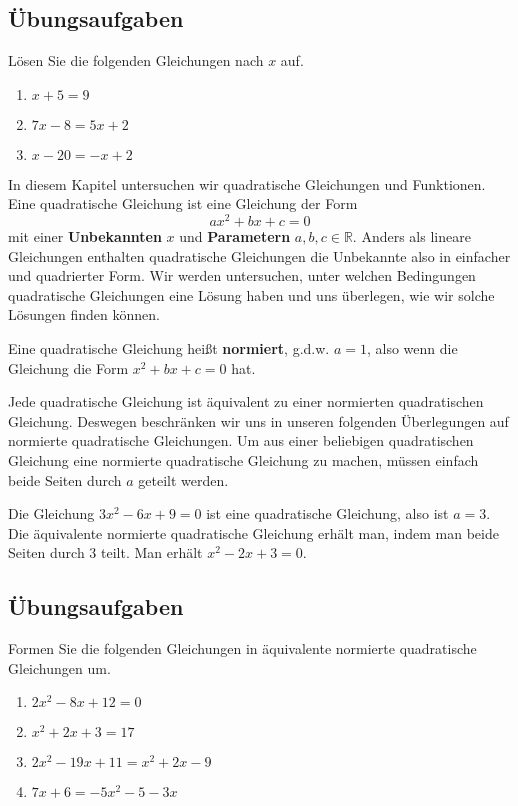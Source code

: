 \documentclass[../../main.tex]{subfiles}
\begin{document}
\subsection*{Übungsaufgaben}
Lösen Sie die folgenden Gleichungen nach $x$ auf.
\begin{enumerate}
    \item $x+5=9$
    \item $7x-8=5x+2$
    \item $x-20=-x+2$
\end{enumerate}
In diesem Kapitel untersuchen wir quadratische Gleichungen und Funktionen. Eine quadratische Gleichung ist eine Gleichung der Form
\[ax^2+bx+c=0\]
mit einer \textbf{Unbekannten} $x$ und \textbf{Parametern} $a,b,c\in\mathbb{R}$. Anders als lineare Gleichungen enthalten quadratische Gleichungen die Unbekannte also in einfacher und quadrierter Form. Wir werden untersuchen, unter welchen Bedingungen quadratische Gleichungen eine Lösung haben und uns überlegen, wie wir solche Lösungen finden können.
\begin{definition}
Eine quadratische Gleichung heißt \textbf{normiert}, g.d.w. $a=1$, also wenn die Gleichung die Form $x^2+bx+c=0$ hat.
\end{definition}
\noindent Jede quadratische Gleichung ist äquivalent zu einer normierten quadratischen Gleichung. Deswegen beschränken wir uns in unseren folgenden Überlegungen auf normierte quadratische Gleichungen. Um aus einer beliebigen quadratischen Gleichung eine normierte quadratische Gleichung zu machen, müssen einfach beide Seiten durch $a$ geteilt werden.
\begin{example}
Die Gleichung $3x^2-6x+9=0$ ist eine quadratische Gleichung, also ist $a=3$. Die äquivalente normierte quadratische Gleichung erhält man, indem man beide Seiten durch 3 teilt. Man erhält $x^2-2x+3=0$.
\end{example}
\subsection*{Übungsaufgaben}
Formen Sie die folgenden Gleichungen in äquivalente normierte quadratische Gleichungen um.
\begin{enumerate}
    \item $2x^2-8x+12=0$
    \item $x^2+2x+3=17$
    \item $2x^2-19x+11=x^2+2x-9$
    \item $7x+6=-5x^2-5-3x$
\end{enumerate}
\end{document}
